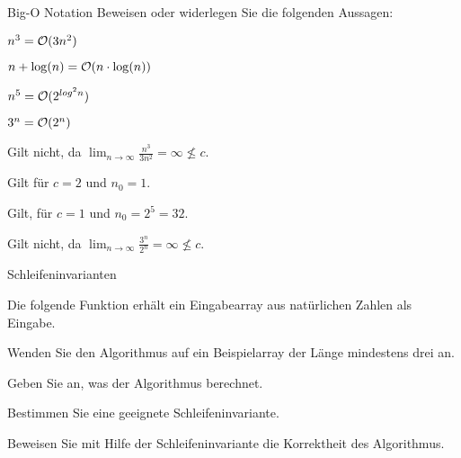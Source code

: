 \documentclass{article}
\begin{document}
\begin{eexercises}{Big-O Notation}{
    Beweisen oder widerlegen Sie die folgenden Aussagen:
  }
  \item $n^3 = \mathcal{O}(3n^2)$
  \item $n + \log(n) = \mathcal{O}(n \cdot \log(n))$
  \item $n^5 = \mathcal{O}(2^{log^2{n}})$
  \item $3^n = \mathcal{O}(2^n)$
\end{eexercises}

\begin{solutions}
  \item Gilt nicht, da $\lim_{n\to\infty} \frac{n^3}{3n^2} = \infty \not\le c$.
  \item Gilt für $c = 2$ und $n_0 = 1$.
  \item Gilt, für $c = 1$ und $n_0 = 2^5 = 32$.
  \item Gilt nicht, da $\lim_{n\to\infty} \frac{3^n}{2^n} = \infty \not\le c$.
\end{solutions}

\begin{eexercises}{Schleifeninvarianten}{
    Die folgende Funktion erhält ein Eingabearray aus natürlichen Zahlen als Eingabe.
    
  }
  \item Wenden Sie den Algorithmus auf ein Beispielarray der Länge mindestens drei an.
  \item Geben Sie an, was der Algorithmus berechnet.
  \item Bestimmen Sie eine geeignete Schleifeninvariante.
  \item Beweisen Sie mit Hilfe der Schleifeninvariante die Korrektheit des Algorithmus.
\end{eexercises}
\end{document}
